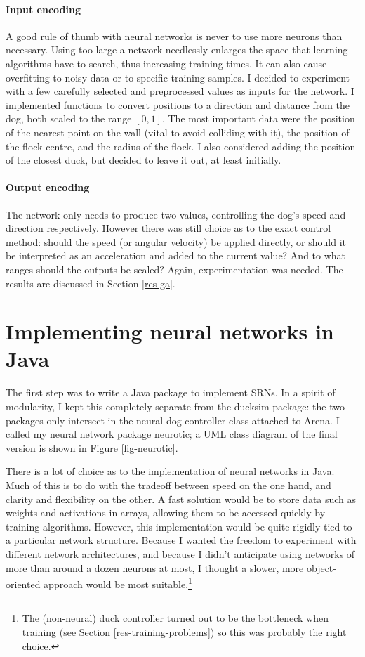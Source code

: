 \documentclass[a4paper]{report}
\newcommand{\code}[1]{{\ttfamily #1}}
\begin{document}
\paragraph{Input encoding} A good rule of thumb with neural networks
is never to use more neurons than necessary. Using too large a network
needlessly enlarges the space that learning algorithms have to search,
thus increasing training times. It can also cause overfitting to noisy
data or to specific training samples. I decided to experiment with a
few carefully selected and preprocessed values as inputs for the
network. I implemented functions to convert positions to a direction
and distance from the dog, both scaled to the range $[0,1]$.  The most
important data were the position of the nearest point on the wall
(vital to avoid colliding with it), the position of the flock centre,
and the radius of the flock. I also considered adding the position of
the closest duck, but decided to leave it out, at least initially.

\paragraph{Output encoding}

The network only needs to produce two values, controlling the dog's
speed and direction respectively. However there was still choice as to
the exact control method: should the speed (or angular velocity) be
applied directly, or should it be interpreted as an acceleration and
added to the current value? And to what ranges should the outputs be
scaled? Again, experimentation was needed. The results are discussed
in Section \ref{res-ga}.

\section{Implementing neural networks in Java}

The first step was to write a Java package to implement SRNs. In a
spirit of modularity, I kept this completely separate from the
\code{ducksim} package: the two packages only intersect in the neural
dog-controller class attached to \code{Arena}. I called my neural
network package \code{neurotic}; a UML class diagram of the final
version is shown in Figure \ref{fig-neurotic}.

There is a lot of choice as to the implementation of neural networks
in Java. Much of this is to do with the tradeoff between speed on the
one hand, and clarity and flexibility on the other. A fast solution
would be to store data such as weights and activations in arrays,
allowing them to be accessed quickly by training algorithms. However,
this implementation would be quite rigidly tied to a particular
network structure. Because I wanted the freedom to experiment with
different network architectures, and because I didn't anticipate using
networks of more than around a dozen neurons at most, I thought a
slower, more object-oriented approach would be most
suitable.\footnote{The (non-neural) duck controller turned out to be
  the bottleneck when training (see Section
  \ref{res-training-problems}) so this was probably the right choice.}
\end{document}
